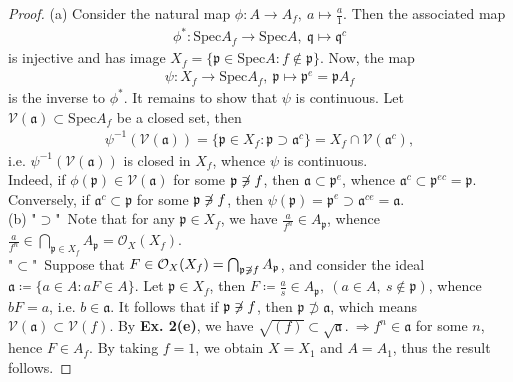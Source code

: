 \documentclass[12pt,a4paper,footinclude=true,headinclude=true]{scrbook} %
\newcommand{\notni}{\not\mathrel{\text{\reflectbox{$\in$}}}}
\begin{document}
\begin{proof}
    (a) Consider the natural map $\phi:A\to A_f,\ a\mapsto \frac{a}{1}$. Then the associated map
    \begin{align*}
        \phi^\ast:\mathrm{Spec}A_f\longrightarrow\mathrm{Spec}A,\ \mathfrak{q}\longmapsto\mathfrak{q}^c    
    \end{align*}
    is injective and has image $X_f=\{\mathfrak{p}\in\mathrm{Spec}A:f\notin\mathfrak{p}\}$. Now, the map
    \begin{align*}
        \psi:X_f\longrightarrow\mathrm{Spec}A_f,\ \mathfrak{p}\longmapsto\mathfrak{p}^e=\mathfrak{p}A_f
    \end{align*}
    is the inverse to $\phi^\ast$. It remains to show that $\psi$ is continuous. Let $\mathcal{V}(\mathfrak{a})\subset\mathrm{Spec}A_f$ be a closed set, then
    \begin{align*}
        \psi^{-1}(\mathcal{V}(\mathfrak{a}))=\{\mathfrak{p}\in X_f:\mathfrak{p}\supset\mathfrak{a}^c\}=X_f\cap\mathcal{V}(\mathfrak{a}^c),
    \end{align*}
    i.e. $\psi^{-1}(\mathcal{V}(\mathfrak{a}))$ is closed in $X_f$, whence $\psi$ is continuous.\\ Indeed, if $\phi(\mathfrak{p})\in\mathcal{V}(\mathfrak{a})$ for some $\mathfrak{p}\notni f$, then $\mathfrak{a}\subset\mathfrak{p}^e$, whence $\mathfrak{a}^c\subset\mathfrak{p}^{ec}=\mathfrak{p}$. Conversely, if $\mathfrak{a}^c\subset\mathfrak{p}$ for some $\mathfrak{p}\notni f$, then $\psi(\mathfrak{p})=\mathfrak{p}^e\supset\mathfrak{a}^{ce}=\mathfrak{a}$.\\
    (b) "$\supset$"\ Note that for any $\mathfrak{p}\in X_f$, we have $\frac{a}{f^n}\in A_\mathfrak{p}$, whence $\frac{a}{f^n}\in\bigcap_{\mathfrak{p}\in X_f}A_\mathfrak{p}=\mathcal{O}_X(X_f)$.\\ "$\subset$"\ Suppose that $F\in\mathcal{O}_X(X_f)=\bigcap_{\mathfrak{p}\notni f}A_\mathfrak{p}$, and consider the ideal $\mathfrak{a}\coloneqq\{a\in A:aF\in A\}$. Let $\mathfrak{p}\in X_f$, then $F\coloneqq\frac{a}{s}\in A_\mathfrak{p},\ (a\in A,\ s\notin\mathfrak{p})$, whence $bF=a$, i.e. $b\in\mathfrak{a}$. It follows that if $\mathfrak{p}\notni f$, then $\mathfrak{p}\not\supset\mathfrak{a}$, which means $\mathcal{V}(\mathfrak{a})\subset\mathcal{V}(f)$. By \textbf{Ex. 2(e)}, we have $\sqrt{(f)}\subset\sqrt{\mathfrak{a}}.\ \Rightarrow f^n\in\mathfrak{a}$ for some $n$, hence $F\in A_f$. By taking $f=1$, we obtain $X=X_1$ and $A=A_1$, thus the result follows.
\end{proof}
\end{document}
